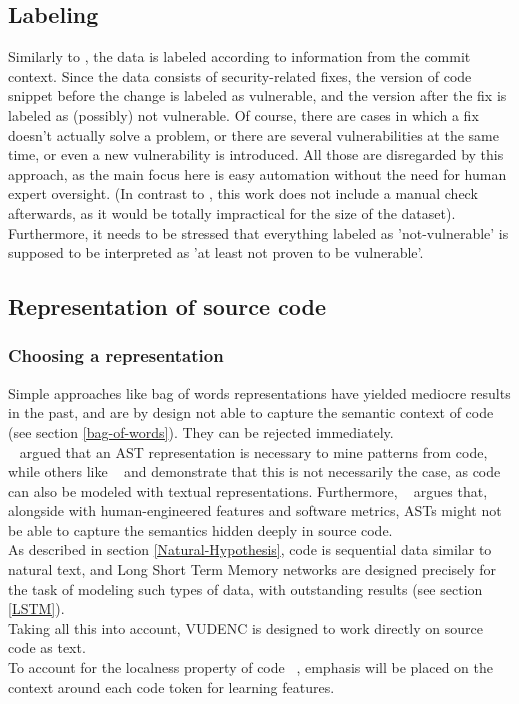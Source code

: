 \documentclass[
	a4paper,
	pagesize,
	pdftex,
	12pt,
	twoside, %
	BCOR=5mm, %
	ngerman,
	fleqn,
	final,
	]{scrartcl}
\begin{document}
\subsection{Labeling}
Similarly to \cite{Li.2018}, the data is labeled according to information from the commit context. Since the data consists of security-related fixes, the version of code snippet before the change is labeled as vulnerable, and the version after the fix is labeled as (possibly) not vulnerable. Of course, there are cases in which a fix doesn't actually solve a problem, or there are several vulnerabilities at the same time, or even a new vulnerability is introduced. All those are disregarded by this approach, as the main focus here is easy automation without the need for human expert oversight. (In contrast to \cite{Li.2018}, this work does not include a manual check afterwards, as it would be totally impractical for the size of the dataset). Furthermore, it needs to be stressed that everything labeled as 'not-vulnerable' is supposed to be interpreted as 'at least not proven to be vulnerable'.

\subsection{Representation of source code}

\subsubsection{Choosing a representation}
Simple approaches like bag of words representations have yielded mediocre results in the past, and are by design not able to capture the semantic context of code (see section \ref{bag-of-words}). They can be rejected immediately.\\
~\cite{Liu.2018} argued that an AST representation is necessary to mine patterns from code, while others like ~\cite{Russell.2018} and \cite{Hovsepyan.2012} demonstrate that this is not necessarily the case, as code can also be modeled with textual representations. Furthermore, ~\cite{Dam.2016} argues that, alongside with human-engineered features and software metrics, ASTs might not be able to capture the semantics hidden deeply in source code.\\
As described in section \ref{Natural-Hypothesis}, code is sequential data similar to natural text, and Long Short Term Memory networks are designed precisely for the task of modeling such types of data, with outstanding results (see section \ref{LSTM}).\\
Taking all this into account, VUDENC is designed to work directly on source code as text.\\
To account for the localness property of code ~\cite{Tu.2014}, emphasis will be placed on the context around each code token for learning features.
\end{document}
